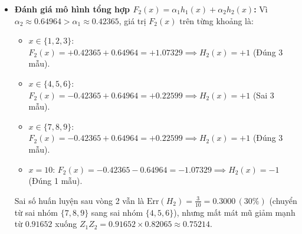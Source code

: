 \documentclass[11pt, a4paper]{article}
\begin{document}
\begin{itemize}
\begin{itemize}
\[        \]
        \item Nhóm mẫu sai ở vòng 1 nhưng đúng ở vòng 2 ($i \in \{7, 8, 9\}$, có $D_2(i) = \frac{1}{6}$):
        \[
        D_3(i) = \frac{\frac{1}{6} \sqrt{3/11}}{\sqrt{33}/7} = \frac{7}{66} \approx 0.10606.
        \]
    \end{itemize}
    Kiểm tra tổng: $4 \times \frac{1}{22} + 3 \times \frac{1}{6} + 3 \times \frac{7}{66} = \frac{12 + 33 + 21}{66} = \frac{66}{66} = 1$.
    \item \textbf{Đánh giá mô hình tổng hợp $F_2(x) = \alpha_1 h_1(x) + \alpha_2 h_2(x)$:}
    Vì $\alpha_2 \approx 0.64964 > \alpha_1 \approx 0.42365$, giá trị $F_2(x)$ trên từng khoảng là:
    \begin{itemize}
        \item $x \in \{1, 2, 3\}$: $F_2(x) = +0.42365 + 0.64964 = +1.07329 \implies H_2(x) = +1$ (Đúng 3 mẫu).
        \item $x \in \{4, 5, 6\}$: $F_2(x) = -0.42365 + 0.64964 = +0.22599 \implies H_2(x) = +1$ (Sai 3 mẫu).
        \item $x \in \{7, 8, 9\}$: $F_2(x) = -0.42365 + 0.64964 = +0.22599 \implies H_2(x) = +1$ (Đúng 3 mẫu).
        \item $x = 10$: $F_2(x) = -0.42365 - 0.64964 = -1.07329 \implies H_2(x) = -1$ (Đúng 1 mẫu).
    \end{itemize}
    Sai số huấn luyện sau vòng 2 vẫn là $\text{Err}(H_2) = \frac{3}{10} = 0.3000 \, (30\%)$ (chuyển từ sai nhóm $\{7, 8, 9\}$ sang sai nhóm $\{4, 5, 6\}$), nhưng mất mát mũ giảm mạnh từ $0.91652$ xuống $Z_1 Z_2 = 0.91652 \times 0.82065 \approx 0.75214$.
\end{itemize}
\end{document}
